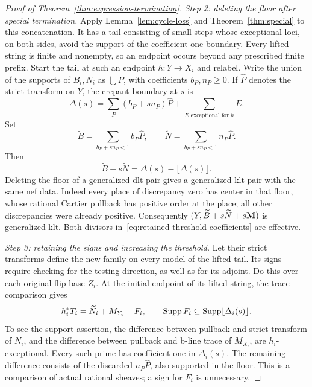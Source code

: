 \begin{proof}[Proof of Theorem~\ref{thm:expression-termination}]
\smallskip\noindent
\emph{Step 2: deleting the floor after special termination.}
Apply Lemma~\ref{lem:cycle-loss} and Theorem~\ref{thm:special} to this
concatenation.  It has a tail consisting of small steps whose exceptional
loci, on both sides, avoid the support of the coefficient-one boundary.
Every lifted string is finite and nonempty, so an endpoint occurs beyond
any prescribed finite prefix.  Start the tail at such an endpoint
$h:Y\to X_i$ and relabel.  Write the union of the supports of $B_i,N_i$
as $\bigcup P$, with coefficients $b_P,n_P\geq0$.  If $\widehat P$
denotes the strict transform on $Y$, the crepant boundary at $s$ is
\[
 \Delta(s)=\sum_P(b_P+sn_P)\widehat P+\sum_{E\text{ exceptional for }h}E.
\]
Set
\begin{equation}\label{eq:retained-threshold-coefficients}
 \widetilde B=\sum_{b_P+sn_P<1}b_P\widehat P,
 \qquad
 \widetilde N=\sum_{b_P+sn_P<1}n_P\widehat P.
\end{equation}
Then
\[
 \widetilde B+s\widetilde N
    =\Delta(s)-\lfloor\Delta(s)\rfloor.
\]
Deleting the floor of a generalized dlt pair gives a generalized klt
pair with the same nef data.  Indeed every place of discrepancy zero
has center in that floor, whose rational Cartier pullback has positive
order at the place; all other discrepancies were already positive.
Consequently $(Y,\widetilde B+s\widetilde N+s\mathbf M)$ is generalized klt.
Both divisors in~\eqref{eq:retained-threshold-coefficients} are effective.

\smallskip\noindent
\emph{Step 3: retaining the signs and increasing the threshold.}
Let their strict transforms define the new family on every model of
the lifted tail.  Its signs require checking for the testing direction,
as well as for its adjoint.  Do this over each original flip base $Z_i$.
At the initial endpoint of its lifted string, the trace comparison gives
\begin{equation}\label{eq:floor-supported-test}
 h_i^*T_i=\widetilde N_i+M_{Y_i}+F_i,
 \qquad
 \operatorname{Supp} F_i\subseteq\operatorname{Supp}\lfloor\Delta_i(s)\rfloor.
\end{equation}
To see the support assertion, the difference between pullback and strict
transform of $N_i$, and the difference between pullback and b-line trace
of $M_{X_i}$, are $h_i$-exceptional.  Every such prime has coefficient
one in $\Delta_i(s)$.  The remaining difference consists of the discarded
$n_P\widehat P$, also supported in the floor.  This is a comparison of
actual rational sheaves; a sign for $F_i$ is unnecessary.


\end{proof}
